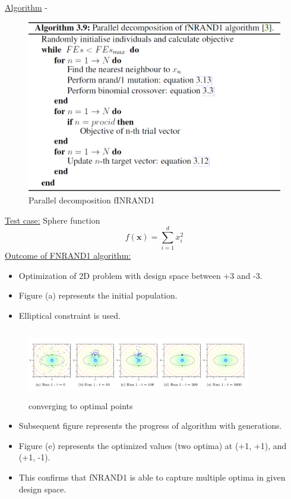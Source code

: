 \begin{frame}[allowframebreaks]{\underline{Algorithm} -}
\begin{figure}
    \includegraphics[scale = 0.192]{figures/parallel_decompo_fNRAND1.png}
    \caption{Parallel decomposition fINRAND1}
    \label{fINRAND1_algorithm}
\end{figure}
\underline{Test case:} Sphere function
\begin{equation}
f(\mathbf{x})=\sum_{i=1}^{d} x_{i}^{2}
\label{sphere function}
\end{equation}
\newpage
\underline{Outcome of FNRAND1 algorithm:}
\begin{itemize}
\item Optimization of 2D problem with design space between +3 and -3.
\item Figure (a) represents the initial population.
\item Elliptical constraint is used.

\end{itemize}

\begin{figure}
    \includegraphics[width = 98mm,height= 30mm]{figures/iteration_convergence.png} 
    \caption{converging to optimal points}
    \label{convergence}
    \end{figure}
    
\begin{itemize}
\item Subsequent figure represents the progress of algorithm with generations.
\item Figure (e) represents the optimized values (two optima) at (+1, +1), and (+1,  -1).
\item This confirms that fNRAND1 is able to capture multiple optima in given design space.
\end{itemize}
\end{frame}
